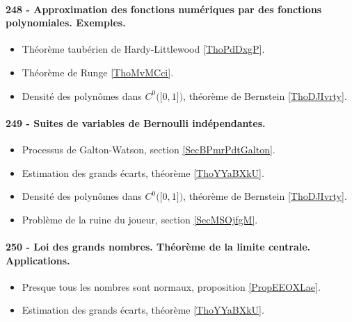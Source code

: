 \paragraph{248 - Approximation des fonctions numériques par des fonctions polynomiales. Exemples.}
\begin{itemize}
    \item Théorème taubérien de Hardy-Littlewood \ref{ThoPdDxgP}.
    \item Théorème de Runge \ref{ThoMvMCci}.
    \item Densité des polynômes dans \( C^0\big( \mathopen[ 0 , 1 \mathclose] \big)\), théorème de Bernstein \ref{ThoDJIvrty}.
\end{itemize}
\paragraph{249 - Suites de variables de Bernoulli indépendantes.}
\begin{itemize}
    \item Processus de Galton-Watson, section \ref{SecBPmrPdtGalton}.
    \item Estimation des grands écarts, théorème \ref{ThoYYaBXkU}.
    \item Densité des polynômes dans \( C^0\big( \mathopen[ 0 , 1 \mathclose] \big)\), théorème de Bernstein \ref{ThoDJIvrty}.
    \item Problème de la ruine du joueur, section \ref{SecMSOjfgM}.
\end{itemize}
\paragraph{250 - Loi des grands nombres. Théorème de la limite centrale. Applications.}
\begin{itemize}
    \item Presque tous les nombres sont normaux, proposition \ref{PropEEOXLae}.
    \item Estimation des grands écarts, théorème \ref{ThoYYaBXkU}.
\end{itemize}
